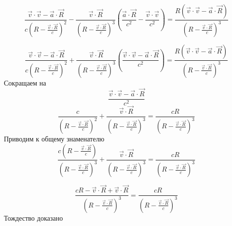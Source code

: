 \documentclass[11pt]{article}
\makeatletter
\newcommand{\boxspacing}{\kern\kvtcb@left@rule\kern\kvtcb@boxsep}
\newcommand{\prompt}[4]{
        {\ttfamily\llap{{\color{#2}[#3]:\hspace{3pt}#4}}\vspace{-\baselineskip}}
    }
\makeatother
\begin{document}
\[\frac{\overrightarrow{v}\cdot \overrightarrow{v}-\overrightarrow{a}\cdot \overrightarrow{R}}{c{{\left( R-\frac{\overrightarrow{v}\cdot \overrightarrow{R}}{c} \right)}^{2}}}-\frac{\overrightarrow{v}\cdot \overrightarrow{R}}{{{\left( R-\frac{\overrightarrow{v}\cdot \overrightarrow{R}}{c} \right)}^{3}}}\left( \frac{\overrightarrow{a}\cdot \overrightarrow{R}}{{{c}^{2}}}-\frac{\overrightarrow{v}\cdot \overrightarrow{v}}{{{c}^{2}}} \right)=\frac{R\left( \vec{v}\cdot \vec{v}-\overrightarrow{a}\cdot \overrightarrow{R} \right)}{{{\left( R-\frac{\overrightarrow{v}\cdot \overrightarrow{R}}{c} \right)}^{3}}}\]

\[\frac{\overrightarrow{v}\cdot \overrightarrow{v}-\overrightarrow{a}\cdot \overrightarrow{R}}{c{{\left( R-\frac{\overrightarrow{v}\cdot \overrightarrow{R}}{c} \right)}^{2}}}+\frac{\overrightarrow{v}\cdot \overrightarrow{R}}{{{\left( R-\frac{\overrightarrow{v}\cdot \overrightarrow{R}}{c} \right)}^{3}}}\left( \frac{\overrightarrow{v}\cdot \overrightarrow{v}-\overrightarrow{a}\cdot \overrightarrow{R}}{{{c}^{2}}} \right)=\frac{R\left( \vec{v}\cdot \vec{v}-\overrightarrow{a}\cdot \overrightarrow{R} \right)}{{{\left( R-\frac{\overrightarrow{v}\cdot \overrightarrow{R}}{c} \right)}^{3}}}\]
Сокращаем на
\[\frac{\overrightarrow{v}\cdot \overrightarrow{v}-\overrightarrow{a}\cdot \overrightarrow{R}}{{{c}^{2}}}\]
\[\frac{c}{{{\left( R-\frac{\overrightarrow{v}\cdot \overrightarrow{R}}{c} \right)}^{2}}}+\frac{\overrightarrow{v}\cdot \overrightarrow{R}}{{{\left( R-\frac{\overrightarrow{v}\cdot \overrightarrow{R}}{c} \right)}^{3}}}=\frac{cR}{{{\left( R-\frac{\overrightarrow{v}\cdot \overrightarrow{R}}{c} \right)}^{3}}}\]
Приводим к общему знаменателю
\[\frac{c\left( R-\frac{\overrightarrow{v}\cdot \overrightarrow{R}}{c} \right)}{{{\left( R-\frac{\overrightarrow{v}\cdot \overrightarrow{R}}{c} \right)}^{3}}}+\frac{\overrightarrow{v}\cdot \overrightarrow{R}}{{{\left( R-\frac{\overrightarrow{v}\cdot \overrightarrow{R}}{c} \right)}^{3}}}=\frac{cR}{{{\left( R-\frac{\overrightarrow{v}\cdot \overrightarrow{R}}{c} \right)}^{3}}}\]

\[\frac{cR-\overrightarrow{v}\cdot \overrightarrow{R}+\overrightarrow{v}\cdot \overrightarrow{R}}{{{\left( R-\frac{\overrightarrow{v}\cdot \overrightarrow{R}}{c} \right)}^{3}}}=\frac{cR}{{{\left( R-\frac{\overrightarrow{v}\cdot \overrightarrow{R}}{c} \right)}^{3}}}\]
Тождество доказано

    \begin{tcolorbox}[breakable, size=fbox, boxrule=1pt, pad at break*=1mm,colback=cellbackground, colframe=cellborder]
\prompt{In}{incolor}{ }{\boxspacing}
\begin{Verbatim}[commandchars=\\\{\}]

\end{Verbatim}
\end{tcolorbox}


    
    
    
\end{document}
